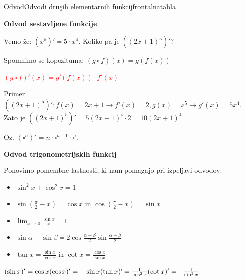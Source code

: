 \begin{priprava}{}{}{Odvod}{Odvodi drugih elementarnih funkcij}{frontalna}{tabla}


\textbf{Odvod sestavljene funkcije}

Vemo že: $ (x^5)' = 5 \cdot x^4 $. Koliko pa je $ ((2x + 1)^5)' $?

Spomnimo se kopozituma: $ (g \circ f)(x) = g(f(x)) $

\textcolor{red}{$ (g \circ f)'(x) = g'(f(x)) \cdot f'(x) $} 

Primer $ ((2x + 1)^5)': f(x) = 2x + 1 \rightarrow f'(x) = 2, g(x) = x^5 \rightarrow g'(x) = 5 x^4 $. Zato je $ ((2x + 1)^5)' = 5 (2x + 1)^4 \cdot 2 = 10 (2x + 1)^4 $

Oz. $ (\square ^n)' = n \cdot \square^{n - 1} \cdot \square' $.


\textbf{Odvod trigonometrijskih funkcij}

Ponovimo pomembne lastnosti, ki nam pomagajo pri izpeljavi odvodov:
\begin{itemize}
    \item $ \sin^2 x + \cos^2 x = 1 $
    \item $ \sin(\frac{\pi}{2} - x) = \cos x $ in $ \cos(\frac{\pi}{2} - x) = \sin x $
    \item $ \lim_{x \to 0} \frac{\sin x}{x} = 1 $
    \item $ \sin \alpha - \sin \beta = 2 \cos \frac{\alpha + \beta}{2} \sin \frac{\alpha - \beta}{2} $
    \item $ \tan x = \frac{\sin x}{\cos x} $ in $ \cot x = \frac{\cos x}{\sin x} $
\end{itemize}


\textcolor{red}{
    $ (\sin x)' = \cos x \\ (\cos x)' = - \sin x \\ (\tan x)' = \frac{1}{\cos^2 x} \\ (\cot x)' = - \frac{1}{\sin^2 x} $
}



\end{priprava}
